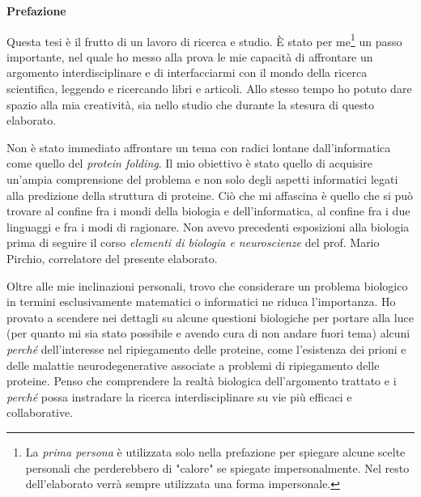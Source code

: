 
\textbf{\LARGE Prefazione}\newline\newline

Questa tesi è il frutto di un lavoro di ricerca e studio. È stato per me\footnote{La \textit{prima persona }è utilizzata solo nella prefazione per spiegare alcune scelte personali che perderebbero di "calore" se spiegate impersonalmente. Nel resto dell'elaborato verrà sempre utilizzata una forma impersonale.} un passo importante, nel quale ho messo alla prova le mie capacità di affrontare un argomento interdisciplinare e di interfacciarmi con il mondo della ricerca scientifica, leggendo e ricercando libri e articoli. Allo stesso tempo ho potuto dare spazio alla mia creatività, sia nello studio che durante la stesura di questo elaborato. \\

\par Non è stato immediato affrontare un tema con radici lontane dall'informatica come quello del \textit{protein folding}. Il mio obiettivo è stato quello di acquisire un'ampia comprensione del problema e non solo degli aspetti informatici legati alla predizione della struttura di proteine. Ciò che mi affascina è quello che si può trovare al confine fra i mondi della biologia e dell'informatica, al confine fra i due linguaggi e fra i modi di ragionare. Non avevo precedenti esposizioni alla biologia prima di seguire il corso \textit{elementi di biologia e neuroscienze} del prof. Mario Pirchio, correlatore del presente elaborato. \\

\par Oltre alle mie inclinazioni personali, trovo che considerare un problema biologico in termini esclusivamente matematici o informatici ne riduca l'importanza. Ho provato a scendere nei dettagli su alcune questioni biologiche per portare alla luce (per quanto mi sia stato possibile e avendo cura di non andare fuori tema) alcuni \textit{perché} dell'interesse nel ripiegamento delle proteine, come l'esistenza dei prioni e delle malattie neurodegenerative associate a problemi di ripiegamento delle proteine. Penso che comprendere la realtà biologica dell'argomento trattato e i \textit{perché} possa instradare la ricerca interdisciplinare su vie più efficaci e collaborative.


\clearpage

